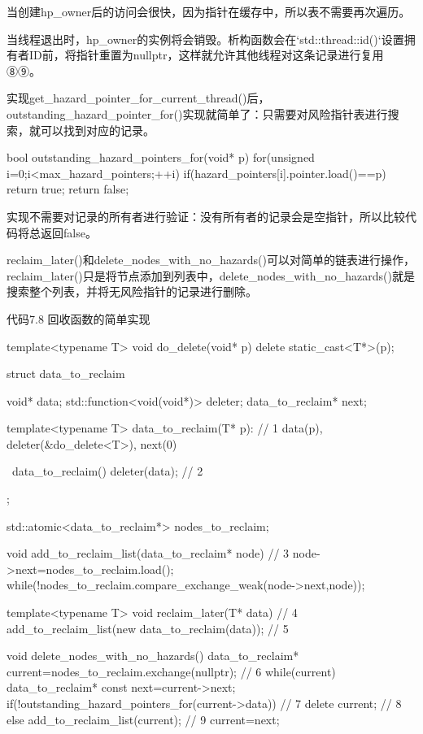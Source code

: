 当创建hp\_owner后的访问会很快，因为指针在缓存中，所以表不需要再次遍历。

当线程退出时，hp\_owner的实例将会销毁。析构函数会在`std::thread::id()`设置拥有者ID前，将指针重置为nullptr，这样就允许其他线程对这条记录进行复用⑧⑨。

实现get\_hazard\_pointer\_for\_current\_thread()后，outstanding\_hazard\_pointer\_for()实现就简单了：只需要对风险指针表进行搜索，就可以找到对应的记录。

\begin{cpp}
bool outstanding_hazard_pointers_for(void* p)
{
  for(unsigned i=0;i<max_hazard_pointers;++i)
  {
    if(hazard_pointers[i].pointer.load()==p)
    {
      return true;
    }
  }
  return false;
}
\end{cpp}

实现不需要对记录的所有者进行验证：没有所有者的记录会是空指针，所以比较代码将总返回false。

reclaim\_later()和delete\_nodes\_with\_no\_hazards()可以对简单的链表进行操作，reclaim\_later()只是将节点添加到列表中，delete\_nodes\_with\_no\_hazards()就是搜索整个列表，并将无风险指针的记录进行删除。

代码7.8 回收函数的简单实现

\begin{cpp}
template<typename T>
void do_delete(void* p)
{
  delete static_cast<T*>(p);
}

struct data_to_reclaim
{
  void* data;
  std::function<void(void*)> deleter;
  data_to_reclaim* next;

  template<typename T>
  data_to_reclaim(T* p):  // 1
    data(p),
    deleter(&do_delete<T>),
    next(0)
  {}

  ~data_to_reclaim()
  {
    deleter(data);  // 2
  }
};

std::atomic<data_to_reclaim*> nodes_to_reclaim;

void add_to_reclaim_list(data_to_reclaim* node)  // 3
{
  node->next=nodes_to_reclaim.load();
  while(!nodes_to_reclaim.compare_exchange_weak(node->next,node));
}

template<typename T>
void reclaim_later(T* data)  // 4
{
  add_to_reclaim_list(new data_to_reclaim(data));  // 5
}

void delete_nodes_with_no_hazards()
{
  data_to_reclaim* current=nodes_to_reclaim.exchange(nullptr);  // 6
  while(current)
  {
    data_to_reclaim* const next=current->next;
    if(!outstanding_hazard_pointers_for(current->data))  // 7
    {
      delete current;  // 8
    }
    else
    {
      add_to_reclaim_list(current);  // 9
    }
    current=next;
  }
}
\end{cpp}

